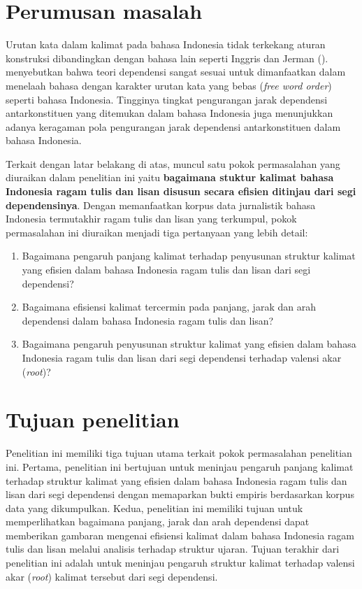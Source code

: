 \section{Perumusan masalah}
Urutan kata dalam kalimat pada bahasa Indonesia tidak terkekang aturan konstruksi dibandingkan dengan bahasa lain seperti Inggris dan Jerman (\citealp{stack2005word, futrell2015large, irmawati2015dependency}). \cite{kubler2009dependency} menyebutkan bahwa teori dependensi sangat sesuai untuk dimanfaatkan dalam menelaah bahasa dengan karakter urutan kata yang bebas (\textit{free word order}) seperti bahasa Indonesia. Tingginya tingkat pengurangan jarak dependensi antarkonstituen yang ditemukan dalam bahasa Indonesia \citep{futrell2015large} juga menunjukkan adanya keragaman pola pengurangan jarak dependensi antarkonstituen dalam bahasa Indonesia.

Terkait dengan latar belakang di atas, muncul satu pokok permasalahan yang diuraikan dalam penelitian ini yaitu \textbf{bagaimana stuktur kalimat bahasa Indonesia ragam tulis dan lisan disusun secara efisien ditinjau dari segi dependensinya}. Dengan memanfaatkan korpus data jurnalistik bahasa Indonesia termutakhir ragam tulis dan lisan yang terkumpul, pokok permasalahan ini diuraikan menjadi tiga pertanyaan yang lebih detail:

\begin{enumerate}
	\item Bagaimana pengaruh panjang kalimat terhadap penyusunan struktur kalimat yang efisien dalam bahasa Indonesia ragam tulis dan lisan dari segi dependensi?
	\item Bagaimana efisiensi kalimat tercermin pada panjang, jarak dan arah dependensi dalam bahasa Indonesia ragam tulis dan lisan?
	\item Bagaimana pengaruh penyusunan struktur kalimat yang efisien dalam bahasa Indonesia ragam tulis dan lisan dari segi dependensi terhadap valensi akar (\textit{root})?
\end{enumerate}

\section{Tujuan penelitian}
Penelitian ini memiliki tiga tujuan utama terkait pokok permasalahan penelitian ini. Pertama, penelitian ini bertujuan untuk meninjau pengaruh panjang kalimat terhadap struktur kalimat yang efisien dalam bahasa Indonesia ragam tulis dan lisan dari segi dependensi dengan memaparkan bukti empiris berdasarkan korpus data yang dikumpulkan. Kedua, penelitian ini memiliki tujuan untuk memperlihatkan bagaimana panjang, jarak dan arah dependensi dapat memberikan gambaran mengenai efisiensi kalimat dalam bahasa Indonesia ragam tulis dan lisan melalui analisis terhadap struktur ujaran. Tujuan terakhir dari penelitian ini adalah untuk meninjau pengaruh struktur kalimat terhadap valensi akar (\textit{root}) kalimat tersebut dari segi dependensi.


